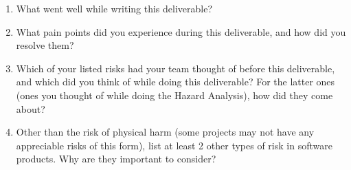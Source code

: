 \documentclass{article}
\begin{document}

% 

\begin{enumerate}
    \item What went well while writing this deliverable? 
    \item What pain points did you experience during this deliverable, and how
    did you resolve them?
    \item Which of your listed risks had your team thought of before this
    deliverable, and which did you think of while doing this deliverable? For
    the latter ones (ones you thought of while doing the Hazard Analysis), how
    did they come about?
    \item Other than the risk of physical harm (some projects may not have any
    appreciable risks of this form), list at least 2 other types of risk in
    software products. Why are they important to consider?
\end{enumerate}
\end{document}
